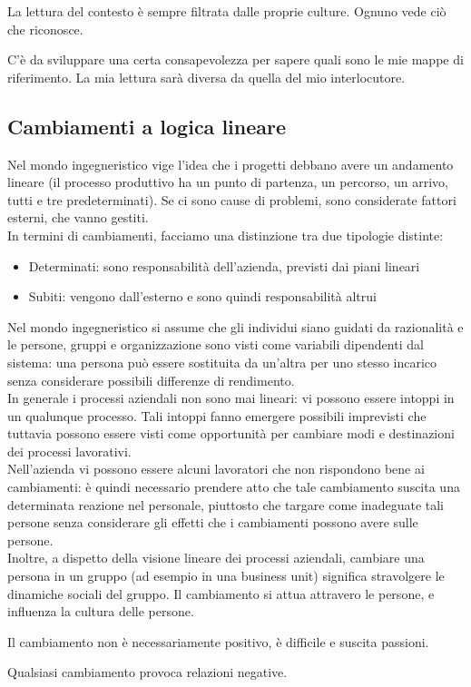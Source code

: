 La lettura del contesto \`e sempre filtrata dalle proprie culture. Ognuno vede ci\`o
che riconosce.

C'\`e da sviluppare una certa consapevolezza per sapere quali sono le mie mappe
di riferimento. La mia lettura sar\`a diversa da quella del mio interlocutore.

\subsection{Cambiamenti a logica lineare}

Nel mondo ingegneristico vige l'idea che i progetti debbano avere un andamento 
lineare (il processo produttivo ha un punto di partenza, un percorso, un arrivo,
tutti e tre predeterminati). Se ci sono cause di problemi, sono considerate 
fattori esterni, che vanno gestiti. \\
In termini di cambiamenti, facciamo una distinzione tra due tipologie distinte:
\begin{itemize}
  \item Determinati: sono responsabilit\`a dell'azienda, previsti dai piani lineari
  \item Subiti: vengono dall'esterno e sono quindi responsabilit\`a altrui
\end{itemize}
Nel mondo ingegneristico si assume che gli individui siano guidati da 
razionalit\`a e le persone, gruppi e organizzazione sono visti come variabili 
dipendenti dal sistema: una persona pu\`o essere sostituita da un'altra per uno 
stesso incarico senza considerare possibili differenze di rendimento. \\
In generale i processi aziendali non sono mai lineari: vi possono essere intoppi 
in un qualunque processo. Tali intoppi fanno emergere possibili imprevisti che 
tuttavia possono essere visti come opportunit\`a per cambiare modi e 
destinazioni dei processi lavorativi. \\
Nell'azienda vi possono essere alcuni lavoratori che non rispondono bene ai 
cambiamenti: \`e quindi necessario prendere atto che tale cambiamento suscita 
una determinata reazione nel personale, piuttosto che targare come inadeguate 
tali persone senza considerare gli effetti che i cambiamenti possono avere sulle 
persone. \\
Inoltre, a dispetto della visione lineare dei processi aziendali, cambiare una
persona in un gruppo (ad esempio in una business unit) significa stravolgere le 
dinamiche sociali del gruppo. Il cambiamento si attua attravero le persone, e 
influenza la cultura delle persone.

Il cambiamento non \`e necessariamente positivo, \`e difficile e suscita 
passioni.

Qualsiasi cambiamento provoca relazioni negative.
